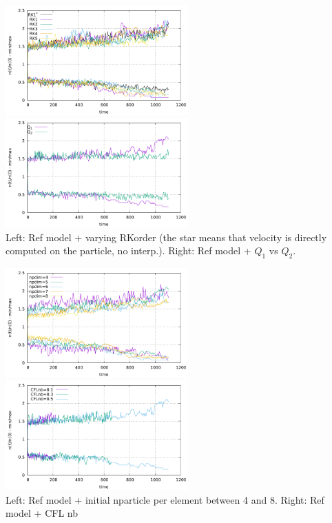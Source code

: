 \begin{center}
\includegraphics[width=7cm]{python_codes/fieldstone_30/results_solcx/markercount_rk12345}
\includegraphics[width=7cm]{python_codes/fieldstone_30/results_solcx/markercount_q12}\\
{\captionfont Left: Ref model + varying RKorder (the star means that velocity 
is directly computed on the particle, no interp.). Right: Ref model + $Q_1$ vs $Q_2$. }
\end{center}


\begin{center}
\includegraphics[width=7cm]{python_codes/fieldstone_30/results_solcx/markercount_npd}
\includegraphics[width=7cm]{python_codes/fieldstone_30/results_solcx/markercount_cflnb}\\
{\captionfont Left: Ref model + initial nparticle per element between 4 and 8. Right: Ref model + CFL nb}
\end{center}

